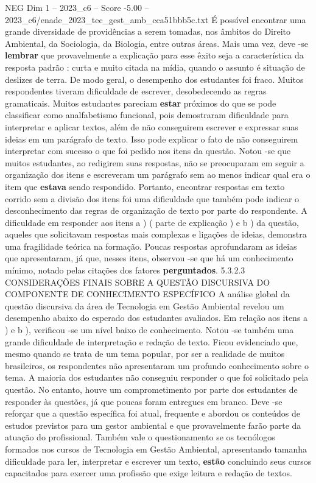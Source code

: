 \begin{textsample}{NEG Dim 1 – 2023\_c6 – Score -5.00 – 2023\_c6/enade\_2023\_tec\_gest\_amb\_cca51bbb5c.txt}
É possível encontrar uma grande diversidade de providências a serem tomadas, nos âmbitos do Direito Ambiental, da Sociologia, da Biologia, entre outras áreas.
Mais uma vez, deve -se \textbf{lembrar} que provavelmente a explicação para esse êxito seja a característica da resposta padrão : curta e muito citada na mídia, quando o assunto é situação de deslizes de terra.
De modo geral, o desempenho dos estudantes foi fraco.
Muitos respondentes tiveram dificuldade de escrever, desobedecendo as regras gramaticais.
Muitos estudantes pareciam \textbf{estar} próximos do que se pode classificar como analfabetismo funcional, pois demostraram dificuldade para interpretar e aplicar textos, além de não conseguirem escrever e expressar suas ideias em um parágrafo de texto.
Isso pode explicar o fato de não conseguirem interpretar com sucesso o que foi pedido nos itens da questão.
Notou -se que muitos estudantes, ao redigirem suas respostas, não se preocuparam em seguir a organização dos itens e escreveram um parágrafo sem ao menos indicar qual era o item que \textbf{estava} sendo respondido.
Portanto, encontrar respostas em texto corrido sem a divisão dos itens foi uma dificuldade que também pode indicar o desconhecimento das regras de organização de texto por parte do respondente.
A dificuldade em responder aos itens a ) ( parte de explicação ) e b ) da questão, aqueles que solicitavam respostas mais complexas e ligações de ideias, demonstra uma fragilidade teórica na formação.
Poucas respostas aprofundaram as ideias que apresentaram, já que, nesses itens, observou -se que há um conhecimento mínimo, notado pelas citações dos fatores \textbf{perguntados}. 5.3.2.3 CONSIDERAÇÕES FINAIS SOBRE A QUESTÃO DISCURSIVA DO COMPONENTE DE CONHECIMENTO ESPECÍFICO A análise global da questão discursiva da área de Tecnologia em Gestão Ambiental revelou um desempenho abaixo do esperado dos estudantes avaliados.
Em relação aos itens a ) e b ), verificou -se um nível baixo de conhecimento.
Notou -se também uma grande dificuldade de interpretação e redação de texto.
Ficou evidenciado que, mesmo quando se trata de um tema popular, por ser a realidade de muitos brasileiros, os respondentes não apresentaram um profundo conhecimento sobre o tema.
A maioria dos estudantes não conseguiu responder o que foi solicitado pela questão.
No entanto, houve um comprometimento por parte dos estudantes de responder às questões, já que poucas foram entregues em branco.
Deve -se reforçar que a questão específica foi atual, frequente e abordou os conteúdos de estudos previstos para um gestor ambiental e que provavelmente farão parte da atuação do profissional.
Também vale o questionamento se os tecnólogos formados nos cursos de Tecnologia em Gestão Ambiental, apresentando tamanha dificuldade para ler, interpretar e escrever um texto, \textbf{estão} concluindo seus cursos capacitados para exercer uma profissão que exige leitura e redação de textos.

\end{textsample}
